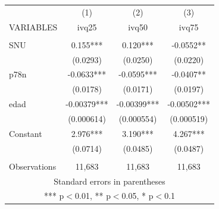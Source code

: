 \begin{tabular}{lccc} \hline
 & (1) & (2) & (3) \\
VARIABLES & ivq25 & ivq50 & ivq75 \\ \hline
 &  &  &  \\
SNU & 0.155*** & 0.120*** & -0.0552** \\
 & (0.0293) & (0.0250) & (0.0220) \\
p78n & -0.0633*** & -0.0595*** & -0.0407** \\
 & (0.0178) & (0.0171) & (0.0197) \\
edad & -0.00379*** & -0.00399*** & -0.00502*** \\
 & (0.000614) & (0.000554) & (0.000519) \\
Constant & 2.976*** & 3.190*** & 4.267*** \\
 & (0.0714) & (0.0485) & (0.0487) \\
 &  &  &  \\
 Observations & 11,683 & 11,683 & 11,683 \\ \hline
\multicolumn{4}{c}{ Standard errors in parentheses} \\
\multicolumn{4}{c}{ *** p$<$0.01, ** p$<$0.05, * p$<$0.1} \\
\end{tabular}
